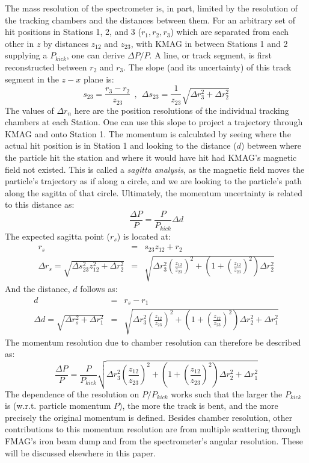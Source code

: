 The mass resolution of the spectrometer is, in part, limited by the resolution of the tracking chambers and the distances between them. For an arbitrary set of hit positions in Stations 1, 2, and 3 ($r_1, r_2, r_3$) which are separated from each other in $z$ by distances $z_{12}$ and $z_{23}$, with KMAG in between Stations 1 and 2 supplying a $P_{kick}$, one can derive $\Delta P / P$. A line, or track segment, is first reconstructed between $r_2$ and $r_3$. The slope (and its uncertainty) of this track segment in the $z-x$ plane is:
\begin{equation}
	s_{23} = \frac{r_3 - r_2}{z_{23}} \ \ ,\ \ \Delta s_{23} = \frac{1}{z_{23}}\sqrt{\Delta r_3^2 + \Delta r_2^2}
\end{equation}
The values of $\Delta r_n$ here are the position resolutions of the individual tracking chambers at each Station. One can use this slope to project a trajectory through KMAG and onto Station 1. The momentum is calculated by seeing where the actual hit position is in Station 1 and looking to the distance ($d$) between where the particle hit the station and where it would have hit had KMAG's magnetic field not existed. This is called a \emph{sagitta analysis}, as the magnetic field moves the particle's trajectory as if along a circle, and we are looking to the particle's path along the sagitta of that circle. Ultimately, the momentum uncertainty is related to this distance as:
\begin{equation}
	\frac{\Delta P }{P} = \frac{P}{P_{kick}}\Delta d
\end{equation}
The expected sagitta point ($r_s$) is located at:
\begin{eqnarray}
r_s & = & s_{23} z_{12} + r_2 \\
\Delta r_s = \sqrt{\Delta s_{23}^2 z_{12}^2 + \Delta r_2^2} & = & \sqrt{ \Delta r_3^2 \left(\frac{z_{12}}{z_{23}}\right)^2 + (1+\left(\frac{z_{12}}{z_{23}}\right)^2) \Delta r_2^2}
\end{eqnarray}
And the distance, $d$ follows as:
\begin{eqnarray}
d & = & r_s - r_1 \\
\Delta d = \sqrt{\Delta r_s^2 + \Delta r_1^2} & = & \sqrt{ \Delta r_3^2 \left(\frac{z_{12}}{z_{23}}\right)^2 + (1 + \left( \frac{z_{12}}{z_{23}} \right)^2) \Delta r_2^2 + \Delta r_1^2}
\end{eqnarray}
The momentum resolution due to chamber resolution can therefore be described as:
\begin{equation}
\frac{\Delta P}{P} = \frac{P}{P_{kick}} \sqrt{ \Delta r_3^2 \left(\frac{z_{12}}{z_{23}}\right)^2 + \left(1 + \left( \frac{z_{12}}{z_{23}} \right)^2 \right) \Delta r_2^2 + \Delta r_1^2}
\end{equation}
The dependence of the resolution on $P/P_{kick}$ works such that the larger the $P_{kick}$ is (w.r.t. particle momentum $P$), the more the track is bent, and the more precisely the original momentum is defined. Besides chamber resolution, other contributions to this momentum resolution are from multiple scattering through FMAG's iron beam dump and from the spectrometer's angular resolution. These will be discussed elsewhere in this paper.

